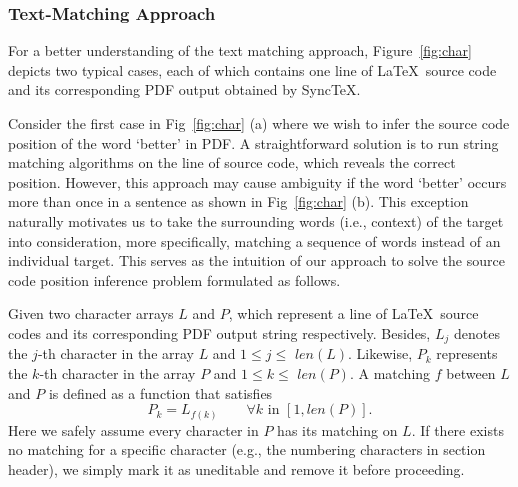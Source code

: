 \documentclass[sigconf]{acmart}
\begin{document}
\subsubsection{Text-Matching Approach}


For a better understanding of the text matching approach, Figure~\ref{fig:char} depicts two typical cases, each of which contains one line of \LaTeX\ source code and its corresponding PDF output obtained by Sync\TeX. 

Consider the first case in Fig~\ref{fig:char} (a) where we wish to infer the source code position of the word `better' in PDF. 
A straightforward solution is to run string matching algorithms on the line of source code, which reveals the correct position. 
However, this approach may cause ambiguity if the word `better' occurs more than once in a sentence as shown in Fig~\ref{fig:char} (b).
This exception naturally motivates us to take the surrounding words (i.e., context) of the target into consideration, more specifically, matching a sequence of words instead of an individual target.
This serves as the intuition of our approach to solve the source code position inference problem formulated as follows.

Given two character arrays $L$ and $P$, which represent a line of \LaTeX\ source codes and its corresponding PDF output string respectively. 
Besides, $L_j$ denotes the $j$-th character in the array $L$ and $ 1 \le j \le $ $len(L)$. 
Likewise, $P_k$ represents the $k$-th character in the array $P$ and $ 1 \le k \le $ $len(P)$. 
A matching $f$ between $L$ and $P$ is defined as a function that satisfies 
\begin{equation}
P_k = L_{f(k)}  \quad \quad \forall k \text{ in } [1, len(P)].
\end{equation}
Here we safely assume every character in $P$ has its matching on $L$. 
If there exists no matching for a specific character (e.g., the numbering characters in section header), we simply mark it as uneditable and remove it before proceeding. 
\end{document}
